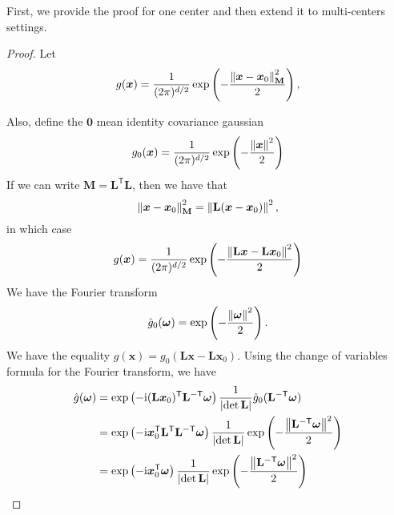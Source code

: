 First, we provide the proof for one center and then extend it to multi-centers settings.
\begin{proof}

Let
\[
    g(\bm{x}) = \frac{1}{(2\pi)^{d/2}} \exp \left( {-\frac{\left\|\bm{x} - \bm{x}_0\right\|_\mathbf{M}^2}{2}} \right) ,
\]

Also, define the $\bm{0}$ mean identity covariance gaussian
\[
    g_0(\bm{x}) = \frac{1}{(2\pi)^{d/2}} \exp \left( {-\frac{\left\|\bm{x}\right\|^2}{2}} \right) 
\]
If we can write $\mathbf{M} = \mathbf{L}^\mathsf{T}\mathbf{L}$, then we have that
\[
\left\|\bm{x} - \bm{x}_0\right\|_\mathbf{M}^2 = \left\|\mathbf{L}(\bm{x} - \bm{x}_0)\right\|^2,
\]
in which case
\[
g(\bm{x}) = \frac{1}{(2\pi)^{d/2}} \exp \left( {-\frac{\left\|\mathbf{L}\bm{x} - \mathbf{L}\bm{x}_0\right\|^2}{2}} \right) 
\]
We have the Fourier transform
\[
    \hat{g}_0(\bm{\omega}) = \exp \left( {-\frac{\left\|\bm{\omega}\right\|^2}{2}} \right) .
\]
We have the equality $g(\bm{x}) = g_0(\mathbf{L}\bm{x} - \mathbf{L}\bm{x}_0)$. Using the change of variables formula for the Fourier transform, we have
\begin{align}
    \hat{g}(\bm{\omega})
    &= \exp \left( {-\mathrm{i}(\mathbf{L}\bm{x}_0)^\mathsf{T}\mathbf{L}^{-\mathsf{T}}\bm{\omega}} \right)  \frac{1}{\left|\det \mathbf{L}\right|} \hat{g}_0(\mathbf{L}^{-\mathsf{T}} \bm{\omega}) \nonumber\\
    &= \exp \left( {-\mathrm{i}\bm{x}_0^\mathsf{T}\mathbf{L}^\mathsf{T}\mathbf{L}^{-\mathsf{T}}\bm{\omega}} \right)  \frac{1}{\left|\det \mathbf{L}\right|} \exp \left( {-\frac{\left\|\mathbf{L}^{-\mathsf{T}} \bm{\omega}\right\|^2}{2}} \right)  \nonumber\\
    &= \exp \left( {-\mathrm{i}\bm{x}_0^\mathsf{T}\bm{\omega}} \right)  \frac{1}{\left|\det \mathbf{L}\right|} \exp \left( {-\frac{\left\|\mathbf{L}^{-\mathsf{T}} \bm{\omega}\right\|^2}{2}} \right)  \label{eq: firstfour}
\end{align}


\end{proof}

